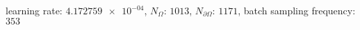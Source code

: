 learning rate: $\num[scientific-notation=true]{4.172759e-04}$, $N_{\Omega}$: $\num[scientific-notation=false]{1013}$, $N_{\partial\Omega}$: $\num[scientific-notation=false]{1171}$, batch sampling frequency: $\num[scientific-notation=false]{353}$